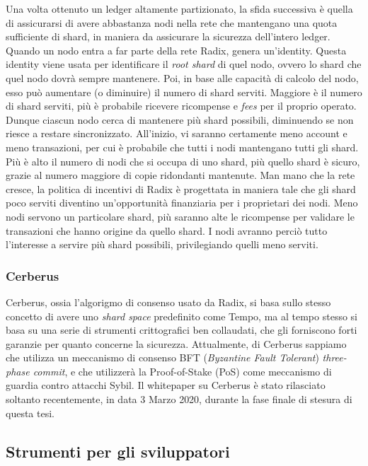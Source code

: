 Una volta ottenuto un ledger altamente partizionato, la sfida successiva è quella di assicurarsi di avere abbastanza nodi nella rete che mantengano una quota sufficiente di shard, in maniera da assicurare la sicurezza dell'intero ledger. Quando un nodo entra a far parte della rete Radix, genera un'identity. Questa identity viene usata per identificare il \textit{root shard} di quel nodo, ovvero lo shard che quel nodo dovrà sempre mantenere. Poi, in base alle capacità di calcolo del nodo, esso può aumentare (o diminuire) il numero di shard serviti. Maggiore è il numero di shard serviti, più è probabile ricevere ricompense e \textit{fees} per il proprio operato. Dunque ciascun nodo cerca di mantenere più shard possibili, diminuendo se non riesce a restare sincronizzato. All'inizio, vi saranno certamente meno account e meno transazioni, per cui è probabile che tutti i nodi mantengano tutti gli shard. Più è alto il numero di nodi che si occupa di uno shard, più quello shard è sicuro, grazie al numero maggiore di copie ridondanti mantenute. Man mano che la rete cresce, la politica di incentivi di Radix è progettata in maniera tale che gli shard poco serviti diventino un'opportunità finanziaria per i proprietari dei nodi. Meno nodi servono un particolare shard, più saranno alte le ricompense per validare le transazioni che hanno origine da quello shard. I nodi avranno perciò tutto l'interesse a servire più shard possibili, privilegiando quelli meno serviti.


\subsubsection{Cerberus}

Cerberus, ossia l'algorigmo di consenso usato da Radix, si basa sullo stesso concetto di avere uno \textit{shard space} predefinito come Tempo, ma al tempo stesso si basa su una serie di strumenti crittografici ben collaudati, che gli forniscono forti garanzie per quanto concerne la sicurezza. Attualmente, di Cerberus sappiamo che utilizza un meccanismo di consenso BFT (\textit{Byzantine Fault Tolerant}) \textit{three-phase commit}, e che utilizzerà la Proof-of-Stake (PoS) come meccanismo di guardia contro attacchi Sybil. Il whitepaper su Cerberus\cite{K10} è stato rilasciato soltanto recentemente, in data 3 Marzo 2020, durante la fase finale di stesura di questa tesi.

\subsection{Strumenti per gli sviluppatori}

